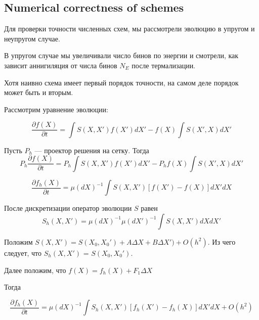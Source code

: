 \documentclass[a4paper, 14pt]{article}
\newcommand{\deriv}[2]{\frac{\partial #1}{\partial #2}}
\begin{document}
	\subsection{Numerical correctness of schemes}

Для проверки точности численных схем, мы рассмотрели эволюцию в упругом и неупругом случае.

В упругом случае мы увеличивали число бинов по энергии и смотрели, как зависит аннигиляция от числа бинов $N_E$ после термализации. 

Хотя наивно схема имеет первый порядок точности, на самом деле порядок может быть и вторым.

Рассмотрим уравнение эволюции:

\begin{equation}
	\deriv{f(X)}{t} = \int{S(X,X')f(X')dX'} - 	 f(X)\int{S(X',X)dX'} 
\end{equation}

Пусть $P_h$ --- проектор решения на сетку. Тогда
\begin{equation}
	P_h\deriv{f(X)}{t} = P_h\int{S(X,X')f(X')dX'} - 	 P_h f(X)\int{S(X',X)dX'} 
\end{equation}

\begin{equation}
	\deriv{f_h(X)}{t} = \mu(dX)^{-1} \int{S(X,X')[f(X')-f(X)]dX'dX}
\end{equation}

После дискретизации оператор эволюции $S$ равен 
\begin{equation}
	S_h(X,X') = \mu(dX)^{-1} \mu(dX')^{-1} \int{S(X,X')dXdX'}
\end{equation}

Положим $S(X,X') = S(X_0,X_0') + A\Delta X + B \Delta X') + O(h^2)$. Из чего следует, что $S_h(X,X')$ = $S(X_0,X_0')$. 

Далее положим, что $f(X) = f_h(X) + F_1\Delta X$

Тогда 

\begin{equation}
	\deriv{f_h(X)}{t} = \mu(dX)^{-1} \int{S_h(X,X')[f_h(X')-f_h(X)]dX'dX} + O(h^2) 
\end{equation}
\end{document}
